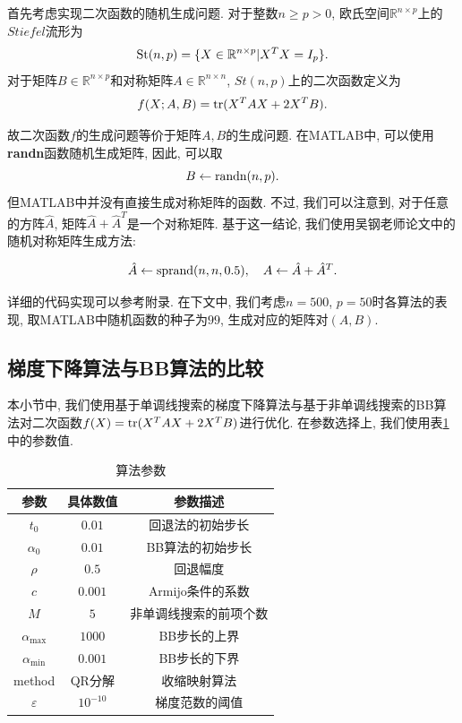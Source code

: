 \documentclass[UTF8]{ctexart}
\begin{document}
首先考虑实现二次函数的随机生成问题. 对于整数$n\geq p>0$, 欧氏空间$\mathbb{R}^{n\times p}$上的$Stiefel$流形为
\[\textup{St}(n,p)=\{X\in\mathbb{R}^{n\times p}|X^T X=I_p\}.\]
对于矩阵$B\in \mathbb{R}^{n\times p}$和对称矩阵$A\in\mathbb{R}^{n\times n}$, $St(n,p)$上的二次函数定义为
\[f(X;A,B)=\textup{tr}(X^T AX+2X^T B).\]

故二次函数$f$的生成问题等价于矩阵$A,B$的生成问题. 在MATLAB中, 可以使用\textbf{randn}函数随机生成矩阵, 因此, 可以取
\[B\leftarrow \textup{randn}(n,p).\]
但MATLAB中并没有直接生成对称矩阵的函数. 不过, 我们可以注意到, 对于任意的方阵$\hat{A}$, 矩阵$\hat{A}+\hat{A}^T$是一个对称矩阵. 基于这一结论, 我们使用吴钢老师论文中的随机对称矩阵生成方法: 

\[\hat{A}\leftarrow \textup{sprand}(n,n,0.5),\quad A\leftarrow \hat{A}+\hat{A}^T.\]

详细的代码实现可以参考附录. 在下文中, 我们考虑$n=500$, $p=50$时各算法的表现, 取MATLAB中随机函数的种子为$99$, 生成对应的矩阵对$(A,B)$.

\subsection{梯度下降算法与BB算法的比较}

本小节中, 我们使用基于单调线搜索的梯度下降算法与基于非单调线搜索的BB算法对二次函数$f(X)=\textup{tr}(X^T AX+2X^T B)$进行优化. 在参数选择上, 我们使用表\ref{tab1} 中的参数值. 

\begin{table}[htb]
    \centering
    \begin{tabular}{c|cc}
        \hline
        \hline
        参数 & 具体数值 & 参数描述\\
        \hline
        $t_0$ & $0.01$ & 回退法的初始步长\\
        $\alpha_0$ & $0.01$ & BB算法的初始步长\\
        $\rho$ & $0.5$ & 回退幅度\\
        $c$ & $0.001$ & Armijo条件的系数\\
        $M$ & $5$ & 非单调线搜索的前项个数\\
        $\alpha_{\max}$ & $1000$ & BB步长的上界\\
        $\alpha_{\min}$ & $0.001$ & BB步长的下界\\
        method & QR分解 & 收缩映射算法\\
        $\varepsilon$ & $10^{-10}$ & 梯度范数的阈值\\
        \hline
        \hline
    \end{tabular}
    \caption{算法参数}\label{tab1}
\end{table}
\end{document}
